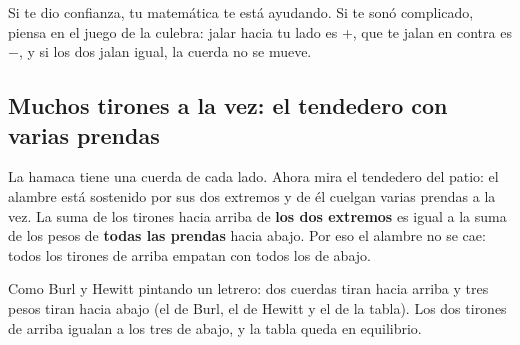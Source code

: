 \documentclass[
  spanish,
  letterpaper,
  12pt,
  oneside,
  open=any,
  DIV=15]{scrbook}
\begin{document}
\begin{tcolorbox}[enhanced jigsaw, arc=.35mm, bottomrule=.15mm, bottomtitle=1mm, breakable, colback=white, colbacktitle=quarto-callout-tip-color!10!white, colframe=quarto-callout-tip-color-frame, coltitle=black, left=2mm, leftrule=.75mm, opacityback=0, opacitybacktitle=0.6, rightrule=.15mm, title=\textcolor{quarto-callout-tip-color}{\faLightbulb}\hspace{0.5em}{Sobre la pregunta socioemocional}, titlerule=0mm, toprule=.15mm, toptitle=1mm]

Si te dio confianza, tu matemática te está ayudando. Si te sonó
complicado, piensa en el juego de la culebra: jalar hacia tu lado es +,
que te jalan en contra es −, y si los dos jalan igual, la cuerda no se
mueve.

\end{tcolorbox}

\subsection{Muchos tirones a la vez: el tendedero con varias
prendas}\label{muchos-tirones-a-la-vez-el-tendedero-con-varias-prendas}

La hamaca tiene una cuerda de cada lado. Ahora mira el tendedero del
patio: el alambre está sostenido por sus dos extremos y de él cuelgan
varias prendas a la vez. La suma de los tirones hacia arriba de
\textcolor[HTML]{7C3AED}{\textbf{los dos extremos}} es igual a la suma
de los pesos de \textcolor[HTML]{2563EB}{\textbf{todas las prendas}}
hacia abajo. Por eso el alambre no se cae: todos los tirones de arriba
empatan con todos los de abajo.

\begin{tcolorbox}[enhanced jigsaw, arc=.35mm, bottomrule=.15mm, bottomtitle=1mm, breakable, colback=white, colbacktitle=quarto-callout-note-color!10!white, colframe=quarto-callout-note-color-frame, coltitle=black, left=2mm, leftrule=.75mm, opacityback=0, opacitybacktitle=0.6, rightrule=.15mm, title=\textcolor{quarto-callout-note-color}{\faInfo}\hspace{0.5em}{Apoyo Visual}, titlerule=0mm, toprule=.15mm, toptitle=1mm]

Como Burl y Hewitt pintando un letrero: dos cuerdas tiran hacia arriba y
tres pesos tiran hacia abajo (el de Burl, el de Hewitt y el de la
tabla). Los dos tirones de arriba igualan a los tres de abajo, y la
tabla queda en equilibrio.

\end{tcolorbox}
\end{document}
